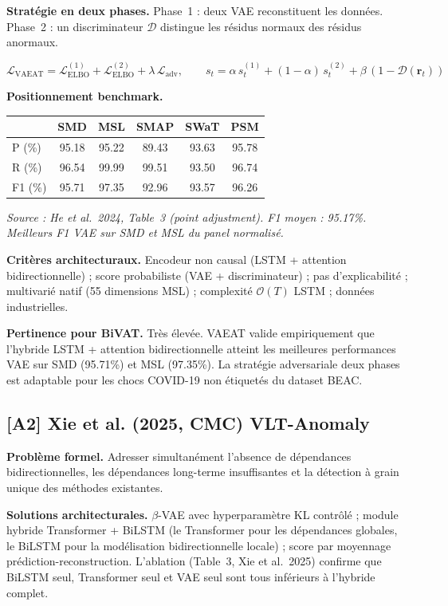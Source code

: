 \documentclass[12pt,a4paper]{article}
\begin{document}
\textbf{Stratégie en deux phases.} Phase~1 : deux VAE reconstituent les
données. Phase~2 : un discriminateur $\mathcal{D}$ distingue les résidus
normaux des résidus anormaux.

$$\mathcal{L}_{\mathrm{VAEAT}} = \mathcal{L}^{(1)}_{\mathrm{ELBO}}
+ \mathcal{L}^{(2)}_{\mathrm{ELBO}} + \lambda\,\mathcal{L}_{\mathrm{adv}},
\qquad
s_t = \alpha\,s^{(1)}_t + (1-\alpha)\,s^{(2)}_t +
\beta\,(1-\mathcal{D}(\mathbf{r}_t))$$

\textbf{Positionnement benchmark.}

\smallskip
\begin{center}
\small
\begin{tabular}{lccccc}
\toprule
& SMD & MSL & SMAP & SWaT & PSM \\
\midrule
P (\%) & 95.18 & 95.22 & 89.43 & 93.63 & 95.78 \\
R (\%) & 96.54 & 99.99 & 99.51 & 93.50 & 96.74 \\
F1 (\%) & 95.71 & 97.35 & 92.96 & 93.57 & 96.26 \\
\bottomrule
\end{tabular}
\end{center}
\smallskip
\noindent\textit{\small Source : He et al.\ 2024, Table~3 (point adjustment).
F1 moyen : 95.17\%. Meilleurs F1 VAE sur SMD et MSL du panel normalisé.}

\textbf{Critères architecturaux.} Encodeur non causal (LSTM + attention
bidirectionnelle) ; score probabiliste (VAE + discriminateur) ; pas
d'explicabilité ; multivarié natif (55 dimensions MSL) ; complexité $\mathcal{O}(T)$
LSTM ; données industrielles.

\textbf{Pertinence pour BiVAT.} Très élevée. VAEAT valide empiriquement que
l'hybride LSTM + attention bidirectionnelle atteint les meilleures performances
VAE sur SMD (95.71\%) et MSL (97.35\%). La stratégie adversariale deux phases
est adaptable pour les chocs COVID-19 non étiquetés du dataset BEAC.

\subsection{[A2] Xie et al. (2025, CMC)  VLT-Anomaly}

\textbf{Problème formel.} Adresser simultanément l'absence de dépendances
bidirectionnelles, les dépendances long-terme insuffisantes et la détection à
grain unique des méthodes existantes.

\textbf{Solutions architecturales.} $\beta$-VAE avec hyperparamètre KL
contrôlé ; module hybride Transformer + BiLSTM (le Transformer pour les
dépendances globales, le BiLSTM pour la modélisation bidirectionnelle locale) ;
score par moyennage prédiction-reconstruction. L'ablation (Table~3, Xie et al.\
2025) confirme que BiLSTM seul, Transformer seul et VAE seul sont tous
inférieurs à l'hybride complet.
\end{document}
